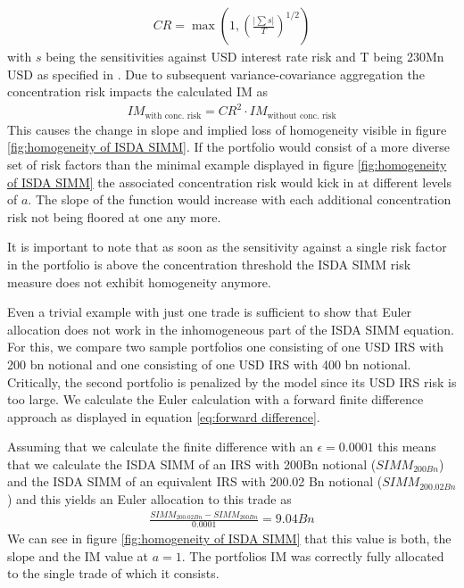 \documentclass[../Thesis_AHoecherl.tex]{subfiles}
\begin{document}
    \begin{align*}
        CR = \max\left(1,\left(\frac{\lvert\sum{s}\rvert}{T}\right)^{1/2}\right)
    \end{align*}
    with $s$ being the sensitivities against USD interest rate risk and T being 230Mn USD as specified in \cite[Article 74]{SIMM}. Due to subsequent variance-covariance aggregation the concentration risk impacts the calculated IM as
    \begin{align*}
        IM_{\text{with conc. risk}} = CR^2 \cdot IM_{\text{without conc. risk}}
    \end{align*}
    This causes the change in slope and implied loss of homogeneity visible in figure \ref{fig:homogeneity of ISDA SIMM}. If the portfolio would consist of a more diverse set of risk factors than the minimal example displayed in figure \ref{fig:homogeneity of ISDA SIMM} the associated concentration risk would kick in at different levels of $a$.
    The slope of the function would increase with each additional concentration risk not being floored at one any more. 
    
    It is important to note that as soon as the sensitivity against a single risk factor in the portfolio is above the concentration threshold the ISDA SIMM risk measure does not exhibit homogeneity anymore.

    Even a trivial example with just one trade is sufficient to show that Euler allocation does not work in the inhomogeneous part of the ISDA SIMM equation.
    For this, we compare two sample portfolios one consisting of one USD IRS with 200 bn notional and one consisting of one USD IRS with 400 bn notional.
    Critically, the second portfolio is penalized by the model since its USD IRS risk is too large. We calculate the Euler calculation with a forward finite difference approach as displayed in equation \ref{eq:forward difference}.

    Assuming that we calculate the finite difference with an $\epsilon = 0.0001$ this means that we calculate the ISDA SIMM of an IRS with 200Bn notional ($SIMM_{200Bn}$) and the ISDA SIMM of an equivalent IRS with 200.02 Bn notional ($SIMM_{200.02Bn}$) and this yields an Euler allocation to this trade as
    \begin{align*}
        \frac{SIMM_{200.02Bn} - SIMM_{200Bn}}{0.0001} = 9.04Bn
    \end{align*}
    We can see in figure \ref{fig:homogeneity of ISDA SIMM} that this value is both, the slope and the IM value at $a = 1$. The portfolios IM was correctly fully allocated to the single trade of which it consists. 
    
\end{document}
